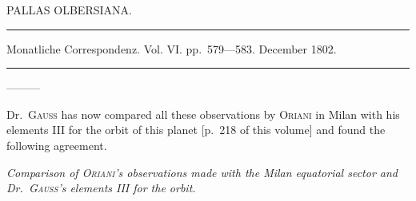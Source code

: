 \bigskip{}
\begin{center}
PALLAS OLBERSIANA.\par
\medskip\hrule\medskip
Monatliche Correspondenz. Vol. VI. pp.\ 579—583. December 1802.\par
\medskip\hrule
\end{center}\medskip
—\quad —\quad —

Dr.\ \textsc{Gauss} has now compared all these observations by \textsc{Oriani} in Milan with his elements III for the orbit of this planet [p.\ 218 of this volume] and found the following agreement.
\begin{center}\textit{Comparison of \textsc{Oriani}’s observations made with the Milan equatorial sector and Dr.\ \textsc{Gauss}’s elements III for the orbit.}\end{center}
